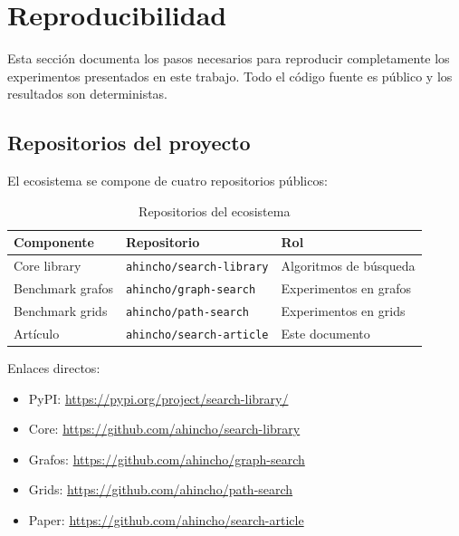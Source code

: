 \section{Reproducibilidad}

Esta sección documenta los pasos necesarios para reproducir completamente los experimentos presentados en este trabajo. Todo el código fuente es público y los resultados son deterministas.

\subsection{Repositorios del proyecto}

El ecosistema se compone de cuatro repositorios públicos:

\begin{table}[H]
\centering
\caption{Repositorios del ecosistema}
\label{tab:repos}
\renewcommand{\arraystretch}{1.3}
\begin{tabular}{@{}lll@{}}
\toprule
\textbf{Componente} & \textbf{Repositorio} & \textbf{Rol} \\
\midrule
Core library & \texttt{ahincho/search-library} & Algoritmos de búsqueda \\
Benchmark grafos & \texttt{ahincho/graph-search} & Experimentos en grafos \\
Benchmark grids & \texttt{ahincho/path-search} & Experimentos en grids \\
Artículo & \texttt{ahincho/search-article} & Este documento \\
\bottomrule
\end{tabular}
\end{table}

Enlaces directos:
\begin{itemize}
    \item PyPI: \url{https://pypi.org/project/search-library/}
    \item Core: \url{https://github.com/ahincho/search-library}
    \item Grafos: \url{https://github.com/ahincho/graph-search}
    \item Grids: \url{https://github.com/ahincho/path-search}
    \item Paper: \url{https://github.com/ahincho/search-article}
\end{itemize}

